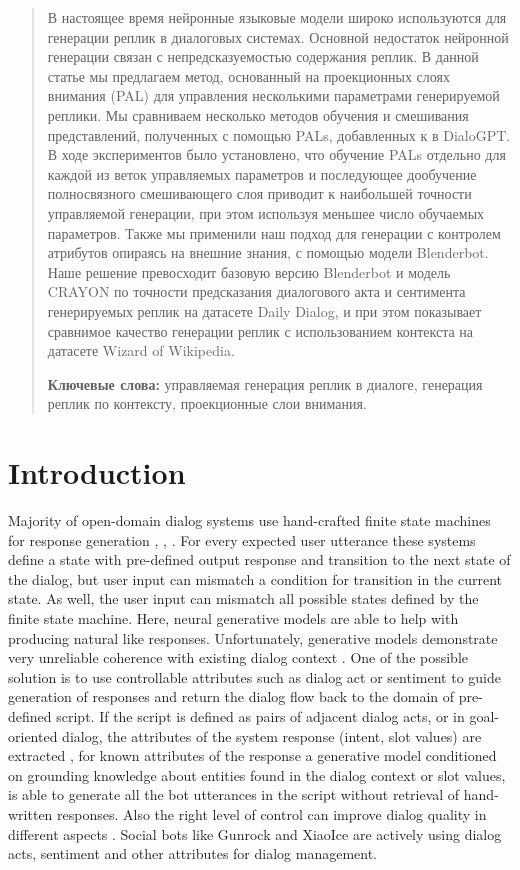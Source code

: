 \documentclass[11pt]{article}
\begin{document}
\begin{abstract}
В настоящее время нейронные языковые модели широко используются для генерации реплик в диалоговых системах. Основной недостаток нейронной генерации связан с непредсказуемостью содержания реплик. В данной статье мы предлагаем метод, основанный на проекционных слоях внимания (PAL) для управления несколькими параметрами генерируемой реплики. Мы сравниваем несколько методов обучения и смешивания представлений, полученных с помощью PALs, добавленных к в DialoGPT. В ходе экспериментов было установлено, что обучение PALs отдельно для каждой из веток управляемых параметров и последующее дообучение полносвязного смешивающего слоя приводит к наибольшей точности управляемой генерации, при этом используя меньшее число обучаемых параметров. Также мы применили наш подход для генерации с контролем атрибутов опираясь на внешние знания, с помощью модели Blenderbot. Наше решение превосходит базовую версию Blenderbot и модель CRAYON по точности предсказания диалогового акта и сентимента генерируемых реплик на датасете Daily Dialog, и при этом показывает сравнимое качество генерации реплик с использованием контекста на датасете Wizard of Wikipedia.
  
  \textbf{Ключевые слова:} управляемая генерация реплик в диалоге, генерация реплик по контексту, проекционные слои внимания.
\end{abstract}

\section{Introduction}
\label{intro}

Majority of open-domain dialog systems use hand-crafted finite state machines for response generation \cite{larsson2000information}, \cite{bocklisch2017rasa}, \cite{finch2020emora}. For every expected user utterance these systems define a state with pre-defined output response and transition to the next state of the dialog, but user input can mismatch a condition for transition in the current state.  As well, the user input can mismatch all possible states defined by the finite state machine. Here, neural generative models are able to help with producing natural like responses. Unfortunately, generative models demonstrate very unreliable coherence with existing dialog context \cite{abhishek2021transformer}. One of the possible solution is to use controllable attributes such as dialog act or sentiment to guide generation of responses and return the dialog flow back to the domain of pre-defined script. If the script is defined as pairs of adjacent dialog acts, or in goal-oriented dialog, the attributes of the system response (intent, slot values) are extracted \cite{wu-etal-2019-transferable}, for known attributes of the response a generative model conditioned on grounding knowledge about entities found in the dialog context or slot values, is able to generate all the bot utterances in the script without retrieval of hand-written responses. Also the right level of control can improve dialog quality in different aspects \cite{see2019makes}. Social bots like Gunrock \cite{gunrock} and XiaoIce \cite{zhou2019design} are actively using dialog acts, sentiment and other attributes for dialog management.
\end{document}
